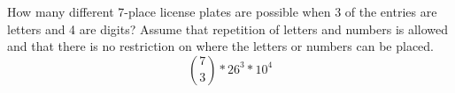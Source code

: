 \item How many different 7-place license plates are possible when 3 of the entries are letters and 4 are digits? Assume that repetition of letters and numbers is allowed and that there is no restriction on where the letters or numbers can be placed.
\[ \binom{7}{3} * 26^3 * 10^4 \]